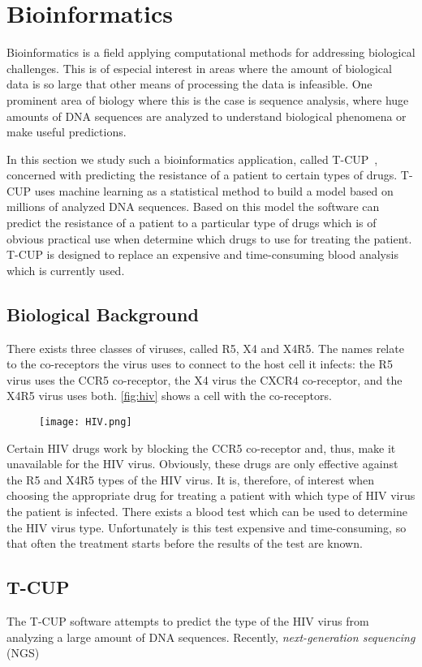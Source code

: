 \section{Bioinformatics}
\label{sec:bioinfo}

Bioinformatics is a field applying computational methods for addressing biological challenges.
This is of especial interest in areas where the amount of biological data is so large that other means of processing the data is infeasible.
One prominent area of biology where this is the case is sequence analysis, where huge amounts of DNA sequences are analyzed to understand biological phenomena or make useful predictions.

In this section we study such a bioinformatics application, called T-CUP~\cite{DybowskiHeHo2010}, concerned with predicting the resistance of a patient to certain types of \HIV drugs.
T-CUP uses machine learning as a statistical method to build a model based on millions of analyzed DNA sequences.
Based on this model the software can predict the resistance of a patient to a particular type of \HIV drugs which is of obvious practical use when determine which drugs to use for treating the patient.
T-CUP is designed to replace an expensive and time-consuming blood analysis which is currently used.

\subsection*{Biological Background}
There exists three classes of \HIV viruses, called R5, X4 and X4R5.
The names relate to the co-receptors the virus uses to connect to the host cell it infects:
the R5 virus uses the {\small CCR5} co-receptor, the X4 virus the {\small CXCR4} co-receptor, and the X4R5 virus uses both.
\autoref{fig:hiv} shows a cell with the co-receptors.
\begin{figure}[t]
  \centering
  \texttt{[image: HIV.png]}
  \caption[]%
          {}
  \label{fig:hiv}
\end{figure}
Certain HIV drugs work by blocking the {\small CCR5} co-receptor and, thus, make it unavailable for the HIV virus.
Obviously, these drugs are only effective against the R5 and X4R5 types of the HIV virus.
It is, therefore, of interest when choosing the appropriate drug for treating a patient with which type of HIV virus the patient is infected.
There exists a blood test which can be used to determine the HIV virus type.
Unfortunately is this test expensive and time-consuming, so that often the treatment starts before the results of the test are known.

\subsection*{T-CUP}
The T-CUP software attempts to predict the type of the HIV virus from analyzing a large amount of DNA sequences.
Recently, \emph{next-generation sequencing} ({\small NGS}) 

